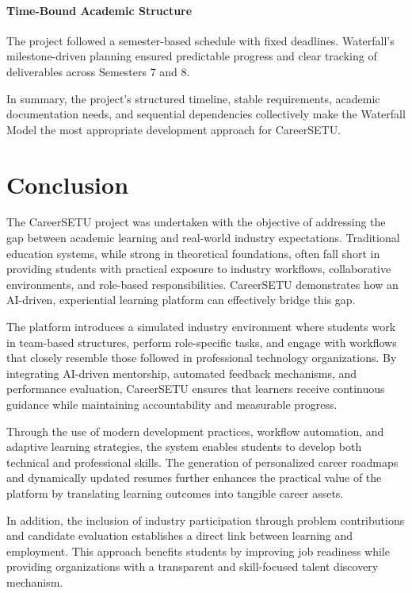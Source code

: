 \documentclass[12pt,a4paper]{report}
\begin{document}
\subsubsection*{Time-Bound Academic Structure}
The project followed a semester-based schedule with fixed deadlines. Waterfall’s milestone-driven planning ensured predictable progress and clear tracking of deliverables across Semesters 7 and 8.

In summary, the project’s structured timeline, stable requirements, academic documentation needs, and sequential dependencies collectively make the Waterfall Model the most appropriate development approach for CareerSETU.


\chapter{Conclusion}

The CareerSETU project was undertaken with the objective of addressing the gap between
academic learning and real-world industry expectations. Traditional education systems,
while strong in theoretical foundations, often fall short in providing students with
practical exposure to industry workflows, collaborative environments, and role-based
responsibilities. CareerSETU demonstrates how an AI-driven, experiential learning
platform can effectively bridge this gap.

The platform introduces a simulated industry environment where students work in
team-based structures, perform role-specific tasks, and engage with workflows that
closely resemble those followed in professional technology organizations. By integrating
AI-driven mentorship, automated feedback mechanisms, and performance evaluation,
CareerSETU ensures that learners receive continuous guidance while maintaining
accountability and measurable progress.

Through the use of modern development practices, workflow automation, and adaptive
learning strategies, the system enables students to develop both technical and
professional skills. The generation of personalized career roadmaps and dynamically
updated resumes further enhances the practical value of the platform by translating
learning outcomes into tangible career assets.

In addition, the inclusion of industry participation through problem contributions and
candidate evaluation establishes a direct link between learning and employment. This
approach benefits students by improving job readiness while providing organizations with
a transparent and skill-focused talent discovery mechanism.
\end{document}
